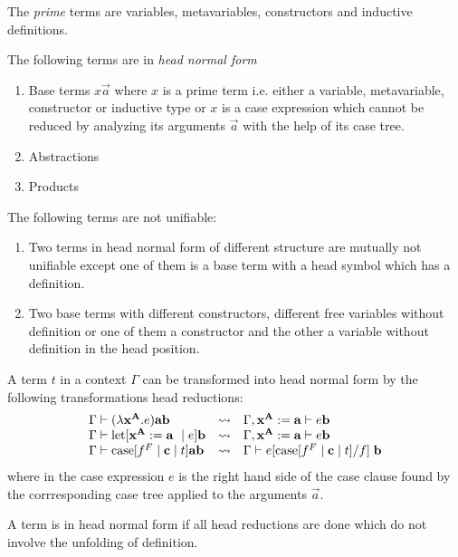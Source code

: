 The \emph{prime} terms are variables, metavariables, constructors and inductive
definitions.

The following terms are in \emph{head normal form}
\begin{enumerate}
    \item Base terms $x \vec a$ where $x$ is a prime term i.e. either a variable,
        metavariable, constructor or inductive type or $x$ is a case expression
        which cannot be reduced by analyzing its arguments $\vec a$ with the help
        of its case tree.

    \item Abstractions

    \item Products
\end{enumerate}

The following terms are not unifiable:
\begin{enumerate}
    \item Two terms in head normal form of different structure are mutually not
        unifiable except one of them is a base term with a head symbol which has
        a definition.

    \item Two base terms with different constructors, different free variables
        without definition or one of them a constructor and the other a variable
        without definition in the head position.
\end{enumerate}

A term $t$ in a context $\Gamma$ can be transformed into head normal form by the
following transformations head reductions:
$$
\begin{array}{lll}
    \Gamma \vdash (\lambda \vec x^{\vec A}. e) \vec a \vec b
    &\leadsto&
    \Gamma, \vec x^{\vec A} := \vec a \vdash e \vec b
    \\
    \Gamma \vdash \llet[\vec x^{\vec A} := \vec a \mid e] \vec b
    &\leadsto&
    \Gamma, \vec x^{\vec A} := \vec a \vdash e \vec b
    \\
    \Gamma \vdash \case[f^F \mid \vec c \mid t] \vec a \vec b
    &\leadsto&
    \Gamma \vdash e[\case [f^F \mid \vec c \mid t] / f] \; \vec b
\end{array}
$$
where in the case expression $e$ is the right hand side of the case clause found
by the corrresponding case tree applied to the arguments $\vec a$.

A term is in head normal form if all head reductions are done which do not
involve the unfolding of definition.

